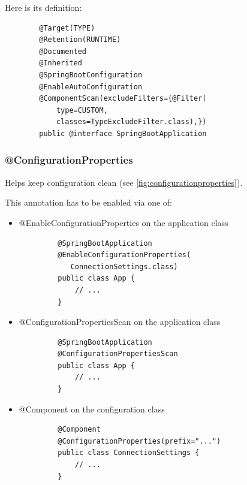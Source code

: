 \documentclass{scrartcl}
\begin{document}
 Here is its definition:

    \begin{lstlisting}
        @Target(TYPE)
        @Retention(RUNTIME)
        @Documented
        @Inherited
        @SpringBootConfiguration
        @EnableAutoConfiguration
        @ComponentScan(excludeFilters={@Filter(
            type=CUSTOM,
            classes=TypeExcludeFilter.class),})
        public @interface SpringBootApplication

    \end{lstlisting}

\subsubsection{@ConfigurationProperties}

    Helps keep configuration clean (see \ref{fig:configurationproperties}).

    This annotation has to be enabled via one of:
    \begin{itemize}
        \item @EnableConfigurationProperties on the application class

        \begin{lstlisting}
         @SpringBootApplication
         @EnableConfigurationProperties(
            ConnectionSettings.class)
         public class App {
             // ...
         }
        \end{lstlisting}

        \item @ConfigurationPropertiesScan  on the application class

        \begin{lstlisting}
         @SpringBootApplication
         @ConfigurationPropertiesScan
         public class App {
             // ...
         }
        \end{lstlisting}

        \item @Component on the configuration class

        \begin{lstlisting}
         @Component
         @ConfigurationProperties(prefix="...")
         public class ConnectionSettings {
             // ...
         }
        \end{lstlisting}

    \end{itemize}
\end{document}
